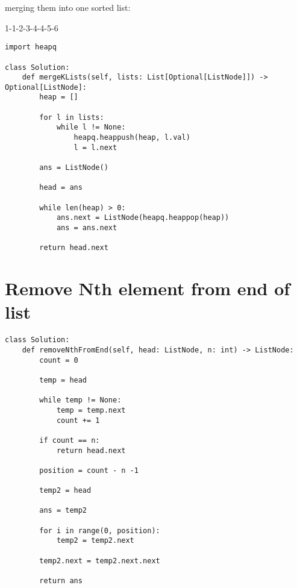 \documentclass[24pt, a4]{article}
\begin{document}
merging them into one sorted list:

1-1-2-3-4-4-5-6
\begin{lstlisting}
import heapq

class Solution:
    def mergeKLists(self, lists: List[Optional[ListNode]]) -> Optional[ListNode]:
        heap = []
        
        for l in lists:
            while l != None:
                heapq.heappush(heap, l.val)
                l = l.next
        
        ans = ListNode()
        
        head = ans
        
        while len(heap) > 0:
            ans.next = ListNode(heapq.heappop(heap))
            ans = ans.next
        
        return head.next
\end{lstlisting}


\section{Remove Nth element from end of list}

\begin{lstlisting}
class Solution:
    def removeNthFromEnd(self, head: ListNode, n: int) -> ListNode:
        count = 0
        
        temp = head
        
        while temp != None:
            temp = temp.next
            count += 1
        
        if count == n:
            return head.next
            
        position = count - n -1 
        
        temp2 = head
        
        ans = temp2
        
        for i in range(0, position):
            temp2 = temp2.next
        
        temp2.next = temp2.next.next
        
        return ans
\end{lstlisting}
\end{document}
